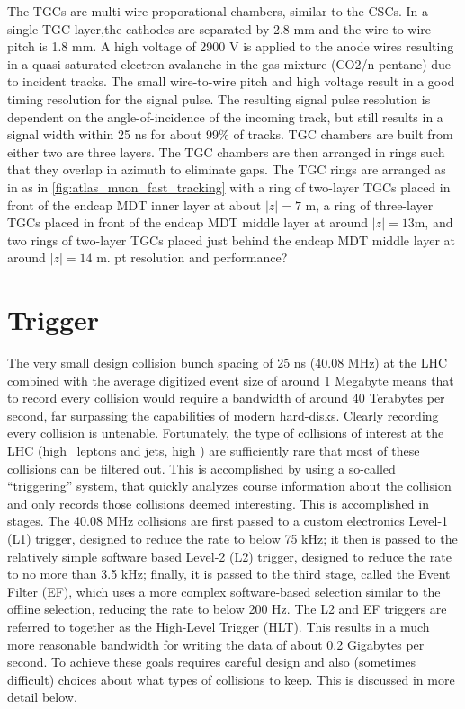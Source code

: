 The TGCs are multi-wire proporational chambers, similar to the CSCs.
In a single TGC layer,the cathodes are separated by 2.8 mm and the wire-to-wire pitch
is 1.8 mm.  A high voltage of 2900 V is applied to the anode wires
resulting in a quasi-saturated electron avalanche in the gas 
mixture (CO2/n-pentane) due to incident tracks.
The small wire-to-wire pitch and high voltage result in a good 
timing resolution for the signal pulse. The resulting
signal pulse resolution is dependent on the angle-of-incidence
of the incoming track, but still results in a signal width
within 25 ns for about 99\% of tracks.
TGC chambers are built from either two are three layers. 
The TGC chambers are then arranged in rings such that they overlap
in azimuth to eliminate gaps.
The TGC rings are arranged as in 
as in \fig\ref{fig:atlas_muon_fast_tracking}
with a ring of two-layer TGCs placed in front of the endcap MDT inner
layer at about $|z|=7$ m, 
a ring of three-layer TGCs placed in front of the endcap MDT
middle layer at around $|z|=13 $m, and two rings of 
two-layer TGCs placed just behind
the endcap MDT middle layer at around $|z|=14$ m.
pt resolution and performance?



\section{Trigger}
\label{sec:atlas_trigger}

The very small design collision bunch spacing 
of 25 ns (40.08 MHz) at the LHC combined with the average digitized event size
of around 1 Megabyte means that to record every collision
would require a bandwidth of around 40 Terabytes per second, far surpassing
the capabilities of modern hard-disks. Clearly recording every collision
is untenable. Fortunately, the type of collisions of interest at the LHC 
(high \pt~leptons and jets, high \met) are sufficiently rare 
that most of these collisions can be filtered out. 
This is accomplished by using a so-called ``triggering'' system, 
that quickly analyzes course information about the collision
and only records those collisions deemed interesting.
This is accomplished in stages. The 40.08 MHz collisions are
first passed to a custom electronics Level-1 (L1) trigger, designed
to reduce the rate to below 75 kHz; it then is passed to the 
relatively simple software based Level-2 (L2) trigger, designed to reduce the rate
to no more than 3.5 kHz; finally, it is passed to the third stage,
called the Event Filter (EF), which uses a more complex software-based 
selection similar to the offline selection, reducing the 
rate to below 200 Hz. The L2 and EF triggers are referred to together
as the High-Level Trigger (HLT). This results in a much more reasonable 
bandwidth for writing the data of about 0.2 Gigabytes per second.
To achieve these goals requires careful design and also (sometimes difficult)
choices about what types of collisions to keep.  This is discussed in more
detail below. 

